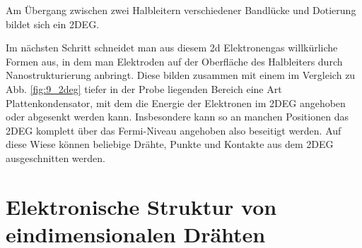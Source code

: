 \begin{marginfigure}[-30mm]
    \caption{Am Übergang zwischen zwei Halbleitern verschiedener Bandlücke und Dotierung bildet sich ein 2DEG. \label{fig:9_2deg}}
\end{marginfigure}


Im nächsten Schritt schneidet man aus diesem 2d Elektronengas willkürliche Formen aus, in dem man Elektroden auf der Oberfläche des Halbleiters durch Nanostrukturierung anbringt. Diese bilden zusammen mit einem im Vergleich zu Abb. \ref{fig:9_2deg} tiefer in der Probe liegenden Bereich eine Art Plattenkondensator, mit dem die Energie der Elektronen im 2DEG angehoben oder abgesenkt werden kann. Insbesondere kann so an manchen Positionen das 2DEG komplett über das Fermi-Niveau angehoben also beseitigt werden. Auf  diese Wiese können beliebige Drähte, Punkte und Kontakte aus dem 2DEG ausgeschnitten werden.



\section{Elektronische Struktur von eindimensionalen Drähten}


